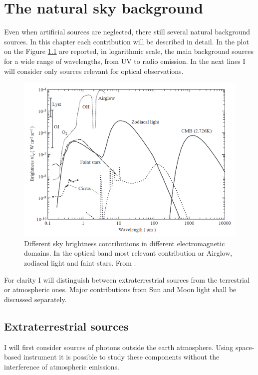 \documentclass[a4paper, titlepage, 10pt]{book}
\begin{document}
\chapter{The natural sky background}
Even when artificial sources are neglected, there still several natural background sources. In this chapter each contribution will be described in detail.  In the plot on the Figure \ref{fig:natural_sources} are reported, in logarithmic scale, the main background sources for a wide range of wavelengths, from UV to radio emission. In the next lines I will consider only sources relevant for optical observations.
\begin{figure}
	\centering
	\includegraphics[width=.7\textwidth]{natural_sources}
	\caption{Different sky brightness contributions in different electromagnetic domains. In the optical band most relevant contribution ar Airglow, zodiacal light and faint stars. From \cite{leinert19981997}.\label{fig:natural_sources}}
\end{figure}
For clarity I will distinguish between extraterrestrial sources from the terrestrial or atmospheric ones. Major contributions from Sun and Moon light shall be discussed separately.


\section{Extraterrestrial sources}
I will first consider sources of photons outside the earth atmosphere. Using space-based instrument it is possible to study these components without the interference of atmospheric emissions.
\end{document}
